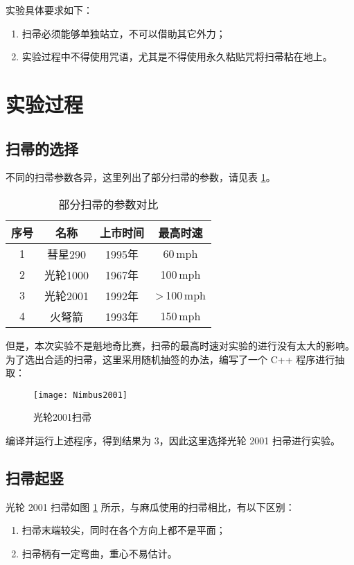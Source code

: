 \documentclass[12pt,a4paper,UTF8]{article}
\begin{document}
  实验具体要求如下：
  \begin{enumerate}
    \item 扫帚必须能够单独站立，不可以借助其它外力；
    \item 实验过程中不得使用咒语，尤其是不得使用永久粘贴咒将扫帚粘在地上。
  \end{enumerate}

  \section{实验过程}
  \subsection{扫帚的选择}
  不同的扫帚参数各异，这里列出了部分扫帚的参数，请见表 \ref{broomsticks}。

  \begin{table}[htbp]
    \centering
    \begin{tabular}{cccc}
      \toprule
      序号 & 名称 & 上市时间 & 最高时速 \\
      \midrule
      1 & 彗星290 & 1995年 & 60\,mph \\
      2 & 光轮1000 & 1967年 & 100\,mph \\
      3 & 光轮2001 & 1992年 & >\,100\,mph \\
      4 & 火弩箭 & 1993年 & 150\,mph \\
      \bottomrule
    \end{tabular}
    \caption{部分扫帚的参数对比}
    \label{broomsticks}
  \end{table}

  但是，本次实验不是魁地奇比赛，扫帚的最高时速对实验的进行没有太大的影响。
  为了选出合适的扫帚，这里采用随机抽签的办法，编写了一个 C++ 程序进行抽取：

  

  \begin{landscape}
    \begin{figure}
      \centering
      \texttt{[image: Nimbus2001]}
      \caption{光轮2001扫帚}
      \label{Nimbus2001}
    \end{figure}
  \end{landscape}

  编译并运行上述程序，得到结果为 3，因此这里选择光轮 2001 扫帚进行实验。

  \subsection{扫帚起竖}
  光轮 2001 扫帚如图 \ref{Nimbus2001} 所示，与麻瓜使用的扫帚相比，有以下区别：
  \begin{enumerate}
    \item 扫帚末端较尖，同时在各个方向上都不是平面；
    \item 扫帚柄有一定弯曲，重心不易估计。
  \end{enumerate}
\end{document}
